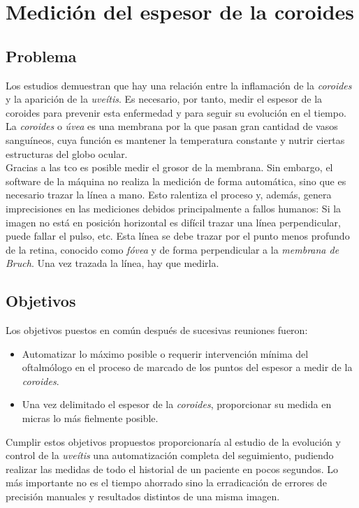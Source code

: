\chapter{Medición del espesor de la coroides}
\section{Problema}
Los estudios demuestran que hay una relación entre la inflamación de
la \emph{coroides} y la aparición de la \emph{uveítis}. Es necesario,
por tanto, medir el espesor de la coroides para prevenir esta
enfermedad y para seguir su evolución en el tiempo.\\
La \emph{coroides} o \emph{úvea} es una membrana por la que pasan gran
cantidad de vasos sanguíneos, cuya función es mantener la temperatura
constante y nutrir ciertas estructuras del globo ocular. \\
Gracias a las \gls{tco} es posible medir el grosor de la membrana. Sin
embargo, el software de la máquina no realiza la medición de forma
automática, sino que es necesario trazar la línea a mano. Esto
ralentiza el proceso y, además, genera imprecisiones en las mediciones
debidos principalmente a fallos humanos: Si la imagen no está en
posición horizontal es difícil trazar una línea perpendicular, puede
fallar el pulso, etc. Esta línea se debe trazar por el punto menos
profundo de la retina, conocido como \emph{fóvea} y de forma
perpendicular a la \emph{membrana de Bruch}. Una vez trazada la línea,
hay que medirla.


\section{Objetivos}
Los objetivos puestos en común después de sucesivas reuniones fueron:
\begin{itemize}
\item Automatizar lo máximo posible o requerir intervención mínima del
  oftalmólogo en el proceso de marcado de los puntos del espesor a
  medir de la \emph{coroides}.
\item Una vez delimitado el espesor de la \emph{coroides},
  proporcionar su medida en micras lo más fielmente posible.
\end{itemize}
Cumplir estos objetivos propuestos proporcionaría al estudio de la
evolución y control de la \emph{uveítis} una automatización completa
del seguimiento, pudiendo realizar las medidas de todo el historial de
un paciente en pocos segundos. Lo más importante no es el tiempo
ahorrado sino la erradicación de errores de precisión manuales y
resultados distintos de una misma imagen.

